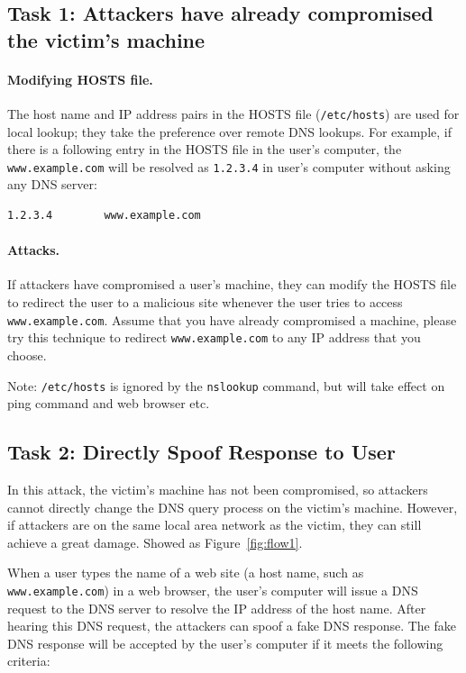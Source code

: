 \subsection{Task 1: Attackers have already compromised the victim's machine}

\paragraph{Modifying HOSTS file.}
The host name and IP address pairs in the HOSTS file (\texttt{/etc/hosts}) 
are used for local lookup; they take the preference over 
remote DNS lookups. For example, if there is a following 
entry in the HOSTS file in the user's computer, 
the \texttt{www.example.com} will be resolved as \texttt{1.2.3.4} in 
user's computer without asking any DNS server:
\begin{verbatim}
1.2.3.4        www.example.com
\end{verbatim}

\paragraph{Attacks.}
If attackers have compromised a user's machine, they can 
modify the HOSTS file to redirect the user to a malicious site
whenever the user tries to access {\tt www.example.com}. Assume that you have 
already compromised a machine, please try this technique to redirect
{\tt www.example.com} to any IP address that you choose.

Note: \texttt{/etc/hosts} is ignored by the {\tt nslookup} command, 
but will take effect on ping command and web browser etc.


\subsection{Task 2: Directly Spoof Response to User}


In this attack, the victim's machine has not been compromised, so attackers cannot
directly change the DNS query process on the victim's machine. However,
if attackers are on the same local area network as the victim, they 
can still achieve a great damage. Showed as Figure~\ref{fig:flow1}.

When a user types the name of a web site (a host name, such as {\tt www.example.com})
in a web browser, the user's computer will issue a DNS request to the DNS 
server to resolve the IP address of the host name.  After hearing this DNS 
request, the attackers can spoof a fake DNS response\cite{bib6}. The fake DNS response 
will be accepted by the user's computer if it meets 
the following criteria:

